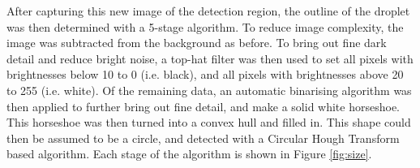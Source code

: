 \documentclass{physics_article_B}
\begin{document}
After capturing this new image of the detection region, the outline of the droplet was then determined with a 5-stage algorithm. To reduce image complexity, the image was subtracted from the background as before. To bring out fine dark detail and reduce bright noise, a top-hat filter was then used to set all pixels with brightnesses below 10 to 0 (i.e. black), and all pixels with brightnesses above 20 to 255 (i.e. white). Of the remaining data, an automatic binarising algorithm was then applied to further bring out fine detail, and make a solid white horseshoe. This horseshoe was then turned into a convex hull and filled in. This shape could then be assumed to be a circle, and detected with a Circular Hough Transform based algorithm. Each stage of the algorithm is shown in Figure \ref{fig:size}.\\
\end{document}
